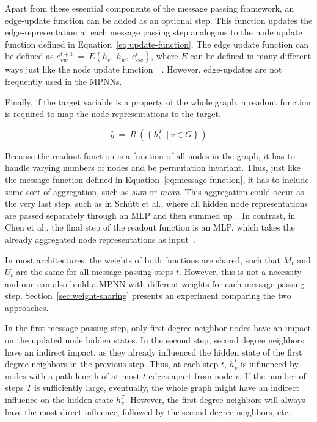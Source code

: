 Apart from these essential components of the message passing framework, an edge-update function can be added as an optional step. This function updates the edge-representation at each message passing step analogous to the node update function defined in Equation~\ref{eq:update-function}. The edge update function can be defined as $e_{vw}^{t+1} ~=~ E(h_v,~ h_w,~ e_{vw}^{t})$, where $E$ can be defined in many different ways just like the node update function~\cite{Kearnes2016}~\cite{Jørgensen2018}. However, edge-updates are not frequently used in the MPNNs.

Finally, if the target variable is a property of the whole graph, a readout function is required to map the node representations to the target.

\begin{equation}\label{eq:readout-function}
	\hat{y} ~=~ R~(~\{~h_v^T\ ~|~ v \in G~\}~)
\end{equation}


Because the readout function is a function of all nodes in the graph, it has to handle varying numbers of nodes and be permutation invariant. Thus, just like the message function defined in Equation~\ref{eq:message-function}, it has to include some sort of aggregation, such as \textit{sum} or \textit{mean}. This aggregation could occur as the very last step, such as in Schütt et al., where all hidden node representations are passed separately through an MLP and then summed up~\cite{Schutt2017}. In contrast, in Chen et al., the final step of the readout function is an MLP, which takes the already aggregated node representations as input~\cite{Chen2019}.

In most architectures, the weights of both functions are shared, such that $M_t$ and $U_t$ are the same for all message passing steps $t$. However, this is not a necessity and one can also build a MPNN with different weights for each message passing step. Section~\ref{sec:weight-sharing} presents an experiment comparing the two approaches.

In the first message passing step, only first degree neighbor nodes have an impact on the updated node hidden states. In the second step, second degree neighbors have an indirect impact, as they already influenced the hidden state of the first degree neighbors in the previous step. Thus, at each step $t$, $h_v^t$ is influenced by nodes with a path length of at most $t$ edges apart from node $v$. If the number of steps $T$ is sufficiently large, eventually, the whole graph might have an indirect influence on the hidden state $h_v^T$. However, the first degree neighbors will always have the most direct influence, followed by the second degree neighbors, etc.

